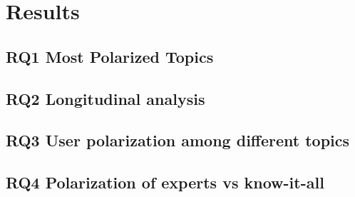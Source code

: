 \chapter{Results}%

\section{RQ1 Most Polarized Topics}




\section{RQ2 Longitudinal analysis}



\section{RQ3 User polarization among different topics}


\section{RQ4 Polarization of experts vs know-it-all }

